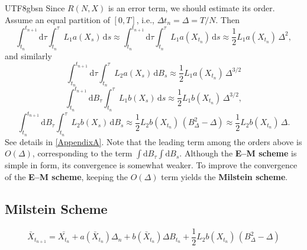 \documentclass{article}
\begin{document}
\begin{CJK*}{UTF8}{gbsn}
Since $R(N,X)$ is an error term, we should estimate its order. Assume an equal partition of $[0,T]$, i.e., $\Delta t_n=\Delta=T/N$. Then
$$
\int_{t_n}^{t_{n+1}}\!\mathrm{d}\tau\int_{t_n}^\tau L_1 a(X_s)\,\mathrm{d}s\approx
\int_{t_n}^{t_{n+1}}\!\mathrm{d}\tau\int_{t_n}^\tau L_1 a(X_{t_n})\,\mathrm{d}s\approx
\frac{1}{2}L_1 a(X_{t_n})\,\Delta^2,
$$
and similarly
\begin{equation}
\int_{t_n}^{t_{n+1}}\!\mathrm{d}\tau\int_{t_n}^\tau L_2 a(X_s)\,\mathrm{d}B_s\approx
\frac{1}{2}L_1 a(X_{t_n})\,\Delta^{3/2}
\label{eq5}\end{equation}
$$
\int_{t_n}^{t_{n+1}}\!\mathrm{d}B_\tau\int_{t_n}^\tau L_1 b(X_s)\,\mathrm{d}s\approx
\frac{1}{2}L_1 b(X_{t_n})\,\Delta^{3/2},
$$
$$
\int_{t_n}^{t_{n+1}}\!\mathrm{d}B_\tau\int_{t_n}^\tau L_2 b(X_s)\,\mathrm{d}B_s\approx
\frac{1}{2}L_2 b(X_{t_n})\,(B_\Delta^2-\Delta)\approx
\frac{1}{2}L_2 b(X_{t_n})\,\Delta.
$$
See details in \ref{AppendixA}. Note that the leading term among the orders above is $O(\Delta)$, corresponding to the term $\int\mathrm{d}B_\tau\int\mathrm{d}B_s$. Although the \textbf{E–M scheme} is simple in form, its convergence is somewhat weaker. To improve the convergence of the \textbf{E–M scheme}, keeping the $O(\Delta)$ term yields the \textbf{Milstein scheme}.

\subsection{Milstein Scheme}
$$
\bar{X}_{t_{n+1}}=\bar{X_{t_n}}+a(\bar{X}_{t_{n}})\Delta_n+b(\bar{X}_{t_{n}})\Delta B_{t_n}+\frac{1}{2}L_2 b(X_{t_n})\,(B_\Delta^2-\Delta)    
$$


\end{CJK*}
\end{document}
